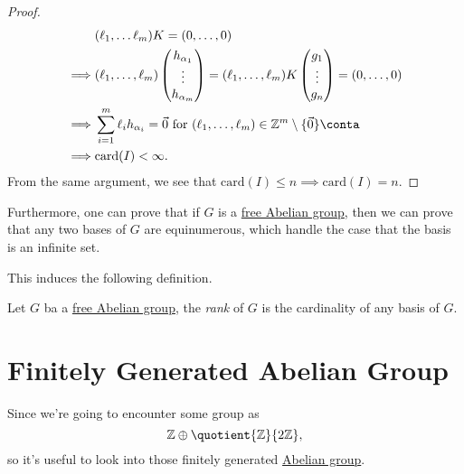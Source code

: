 \begin{proof}
\[\begin{split}
			&(\ell _1, \ldots \ell _{m})K = (0, \ldots , 0 )\\
			\implies &(\ell _1, \ldots , \ell _{m}  )\begin{pmatrix}
				h_{\alpha _1} \\
				\vdots        \\
				h_{\alpha _m} \\
			\end{pmatrix} = (\ell _1, \ldots , \ell _m )K \begin{pmatrix}
				g_1    \\
				\vdots \\
				g_n    \\
			\end{pmatrix} = (0, \ldots , 0)\\
			\implies &\sum\limits_{i=1}^{m} \ell _{i} h_{\alpha _{i} }= \vec{0} \text{ for \((\ell_1, \ldots, \ell_m)\in \mathbb{Z}^m\setminus \{\vec{0}\}\)} \conta\\
			\implies &\mathrm{card} (I) < \infty.
		\end{split}
	\]
	From the same argument, we see that \(\mathrm{card} (I) \leq n\implies \mathrm{card} (I) = n\).
\end{proof}

\begin{remark}
	Furthermore, one can prove that if \(G\) is a \hyperref[def:free-Abelian-group]{free Abelian group}, then we can prove that any two bases of \(G\) are equinumerous, which
	handle the case that the basis is an infinite set.
\end{remark}
This induces the following definition.

\begin{definition}[Rank]\label{def:rank}
	Let \(G\) ba a \hyperref[def:free-Abelian-group]{free Abelian group}, the \emph{rank} of \(G\) is the cardinality of any basis of \(G\).
\end{definition}

\section{Finitely Generated Abelian Group}\label{apx:ssc:finitely-generated-Abelian-group}
Since we're going to encounter some group as
\[
	\mathbb{\MakeUppercase{z}} \oplus \quotient{\mathbb{\MakeUppercase{z}}}{2\mathbb{\MakeUppercase{z}} },
\]
so it's useful to look into those finitely generated \hyperref[def:Abelian-group]{Abelian group}.

